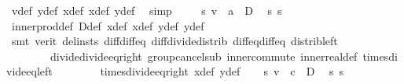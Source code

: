 \begin{isabellebody}
\ v{\isacharunderscore}{\kern0pt}def\ y{}{\isacharunderscore}{\kern0pt}def\ x{}{\isacharunderscore}{\kern0pt}def\ x{}{\isacharunderscore}{\kern0pt}def\ y{}{\isacharunderscore}{\kern0pt}def\ \isamarkupfalse%
\ simp\ \isanewline
\ \ \isamarkupfalse%
\ s{\isacharunderscore}{\kern0pt}{}{\isacharcolon}{\kern0pt}\ {\isachardoublequoteopen}v\ {\isasymbullet}\ a\ {\isacharequal}{\kern0pt}\ D{\isachardoublequoteclose}\ \isamarkupfalse%
\ s{\isacharunderscore}{\kern0pt}{}\ s{\isacharunderscore}{\kern0pt}{}\ \isamarkupfalse%
\ inner{\isacharunderscore}{\kern0pt}prod{\isacharunderscore}{\kern0pt}def\ D{\isacharunderscore}{\kern0pt}def\ x{}{\isacharunderscore}{\kern0pt}def\ x{}{\isacharunderscore}{\kern0pt}def\ y{}{\isacharunderscore}{\kern0pt}def\ y{}{\isacharunderscore}{\kern0pt}def\isanewline
\ \ \ \ \isamarkupfalse%
\ {\isacharparenleft}{\kern0pt}smt\ {\isacharparenleft}{\kern0pt}verit{\isacharcomma}{\kern0pt}\ del{\isacharunderscore}{\kern0pt}insts{\isacharparenright}{\kern0pt}\ diff{\isacharunderscore}{\kern0pt}diff{\isacharunderscore}{\kern0pt}eq{}\ diff{\isacharunderscore}{\kern0pt}divide{\isacharunderscore}{\kern0pt}distrib\ diff{\isacharunderscore}{\kern0pt}eq{\isacharunderscore}{\kern0pt}diff{\isacharunderscore}{\kern0pt}eq\ distrib{\isacharunderscore}{\kern0pt}left\isanewline
\ \ \ \ \ \ \ \ divide{\isacharunderscore}{\kern0pt}divide{\isacharunderscore}{\kern0pt}eq{\isacharunderscore}{\kern0pt}right\ group{\isacharunderscore}{\kern0pt}cancel{\isachardot}{\kern0pt}sub{}\ inner{\isacharunderscore}{\kern0pt}commute\ inner{\isacharunderscore}{\kern0pt}real{\isacharunderscore}{\kern0pt}def\ times{\isacharunderscore}{\kern0pt}divide{\isacharunderscore}{\kern0pt}eq{\isacharunderscore}{\kern0pt}left\isanewline
\ \ \ \ \ \ \ \ times{\isacharunderscore}{\kern0pt}divide{\isacharunderscore}{\kern0pt}eq{\isacharunderscore}{\kern0pt}right\ x{}{\isacharunderscore}{\kern0pt}def\ y{}{\isacharunderscore}{\kern0pt}def{\isacharparenright}{\kern0pt}\isanewline
\ \ \isamarkupfalse%
\ s{\isacharunderscore}{\kern0pt}{}{\isacharcolon}{\kern0pt}\ {\isachardoublequoteopen}v\ {\isasymbullet}\ c\ {\isacharequal}{\kern0pt}\ D{\isachardoublequoteclose}\ \isamarkupfalse%
\ s{\isacharunderscore}{\kern0pt}{}\ s{\isacharunderscore}{\kern0pt}{}\ \ \isamarkupfalse%

\end{isabellebody}
